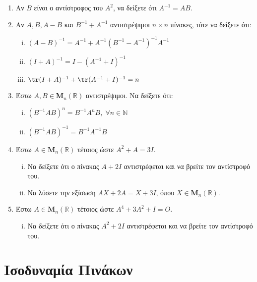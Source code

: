 \begin{enumerate}
  \item Αν $B$ είναι ο αντίστροφος του $ A^{2} $, να δείξετε ότι $ A^{-1}=AB $.

  \item Αν $ A,B,A-B $ και $ B^{-1}+A^{-1} $ αντιστρέψιμοι 
    $ n \times n $ πίνακες, τότε να δείξετε ότι:
    \begin{enumerate}[i)]
      \item $ (A-B)^{-1} = A^{-1}+A^{-1}(B^{-1}-A^{-1})^{-1}A^{-1} $
      \item $ (I+A)^{-1} = I-(A^{-1}+I)^{-1} $
      \item $\tr(I+A)^{-1} + \tr(A^{-1}+I)^{-1} = n $
    \end{enumerate}
    
  \item Έστω $ A, B \in \textbf{M}_{n}(\mathbb{R}) $ αντιστρέψιμοι. Να δείξετε ότι:
    \begin{enumerate}[i)]
      \item $ (B^{-1}AB)^{n} = B^{-1}A^{n}B, \; \forall n \in \mathbb{N} $
      \item $ (B^{-1}AB)^{-1} = B^{-1}A^{-1}B $
    \end{enumerate}

  \item Έστω $ A \in \textbf{M}_{n}(\mathbb{R}) $ τέτοιος ώστε $ A^{2}+A=3I $. 
    \begin{enumerate}[i)]
      \item Να δείξετε ότι ο πίνακας $ A+2I $ αντιστρέφεται και να βρείτε τον αντίστροφό
        του.
      \item Να λύσετε την εξίσωση $ AX+2A=X+3I $, όπου 
        $ X \in \textbf{M}_{n}(\mathbb{R}) $.
    \end{enumerate}

  \item Έστω $ A \in \textbf{M}_{n}(\mathbb{R}) $ τέτοιος ώστε $ A^{4}+3A^{2}+I=Ο $. 
    \begin{enumerate}[i)]
      \item Να δείξετε ότι ο πίνακας $ A^{2}+2I $ αντιστρέφεται και να βρείτε τον 
        αντίστροφό του.
    \end{enumerate}


\end{enumerate}

\section*{Ισοδυναμία Πινάκων}

